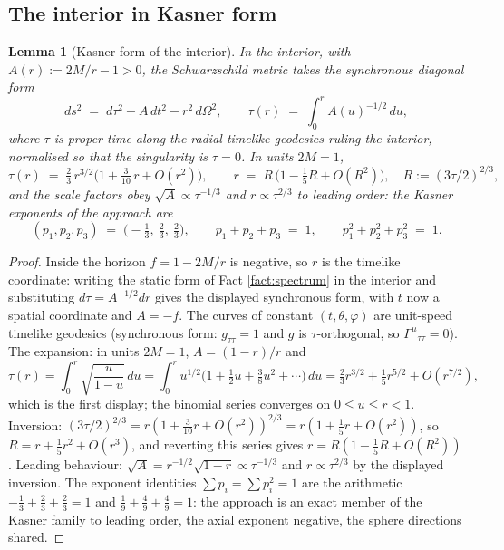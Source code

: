 \documentclass[11pt]{article}
\newtheorem{lemma}[theorem]{Lemma}
\theoremstyle{definition}
\begin{document}
\subsection{The interior in Kasner form}\label{subsec:kasner}

\begin{lemma}[Kasner form of the interior]\label{lem:kasnerform}
In the interior, with $A(r) := 2M/r - 1 > 0$, the Schwarzschild metric takes the synchronous diagonal form
\[
ds^2 \;=\; d\tau^2 - A\,dt^2 - r^2\,d\Omega^2,
\qquad
\tau(r) \;=\; \int_0^r A(u)^{-1/2}\,du ,
\]
where $\tau$ is proper time along the radial timelike geodesics ruling the interior, normalised so that the singularity is $\tau = 0$. In units $2M = 1$,
\[
\tau(r) \;=\; \tfrac23\, r^{3/2}\bigl(1 + \tfrac{3}{10}\,r + O(r^2)\bigr),
\qquad
r \;=\; R\,\bigl(1 - \tfrac15 R + O(R^2)\bigr), \quad R := (3\tau/2)^{2/3},
\]
and the scale factors obey $\sqrt{A} \propto \tau^{-1/3}$ and $r \propto \tau^{2/3}$ to leading order: the Kasner exponents of the approach are
\[
(p_1, p_2, p_3) \;=\; \bigl(-\tfrac13,\ \tfrac23,\ \tfrac23\bigr),
\qquad
p_1 + p_2 + p_3 \;=\; 1, \qquad p_1^2 + p_2^2 + p_3^2 \;=\; 1 .
\]
\end{lemma}

\begin{proof}
Inside the horizon $f = 1 - 2M/r$ is negative, so $r$ is the timelike coordinate: writing the static form of Fact \ref{fact:spectrum} in the interior and substituting $d\tau = A^{-1/2}dr$ gives the displayed synchronous form, with $t$ now a spatial coordinate and $A = -f$. The curves of constant $(t,\theta,\varphi)$ are unit-speed timelike geodesics (synchronous form: $g_{\tau\tau} = 1$ and $g$ is $\tau$-orthogonal, so $\Gamma^\mu{}_{\tau\tau} = 0$). The expansion: in units $2M = 1$, $A = (1-r)/r$ and
\[
\tau(r) = \int_0^r \sqrt{\frac{u}{1-u}}\,du
= \int_0^r u^{1/2}\bigl(1 + \tfrac12 u + \tfrac38 u^2 + \cdots\bigr)\,du
= \tfrac23 r^{3/2} + \tfrac15 r^{5/2} + O(r^{7/2}),
\]
which is the first display; the binomial series converges on $0 \le u \le r < 1$. Inversion: $(3\tau/2)^{2/3} = r(1 + \tfrac{3}{10}r + O(r^2))^{2/3} = r(1 + \tfrac15 r + O(r^2))$, so $R = r + \tfrac15 r^2 + O(r^3)$, and reverting this series gives $r = R(1 - \tfrac15 R + O(R^2))$. Leading behaviour: $\sqrt A = r^{-1/2}\sqrt{1-r} \propto \tau^{-1/3}$ and $r \propto \tau^{2/3}$ by the displayed inversion. The exponent identities $\sum p_i = \sum p_i^2 = 1$ are the arithmetic $-\tfrac13 + \tfrac23 + \tfrac23 = 1$ and $\tfrac19 + \tfrac49 + \tfrac49 = 1$: the approach is an exact member of the Kasner family to leading order, the axial exponent negative, the sphere directions shared.
\end{proof}
\end{document}
